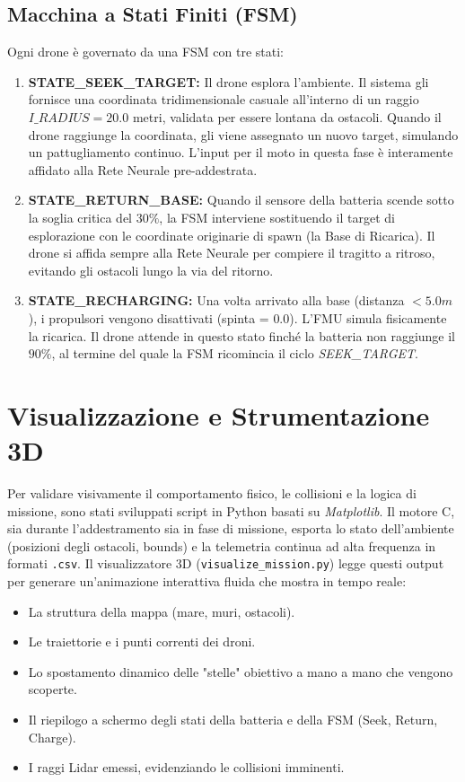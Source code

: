 ﻿\documentclass[12pt,a4paper]{article}
\begin{document}
\subsection{Macchina a Stati Finiti (FSM)}
Ogni drone è governato da una FSM con tre stati:
\begin{enumerate}
    \item \textbf{STATE\_SEEK\_TARGET:} Il drone esplora l'ambiente. Il sistema gli fornisce una coordinata tridimensionale casuale all'interno di un raggio $I\_RADIUS = 20.0$ metri, validata per essere lontana da ostacoli. Quando il drone raggiunge la coordinata, gli viene assegnato un nuovo target, simulando un pattugliamento continuo. L'input per il moto in questa fase è interamente affidato alla Rete Neurale pre-addestrata.
    \item \textbf{STATE\_RETURN\_BASE:} Quando il sensore della batteria scende sotto la soglia critica del $30\%$, la FSM interviene sostituendo il target di esplorazione con le coordinate originarie di spawn (la Base di Ricarica). Il drone si affida sempre alla Rete Neurale per compiere il tragitto a ritroso, evitando gli ostacoli lungo la via del ritorno.
    \item \textbf{STATE\_RECHARGING:} Una volta arrivato alla base (distanza $< 5.0m$), i propulsori vengono disattivati (spinta = $0.0$). L'FMU simula fisicamente la ricarica. Il drone attende in questo stato finché la batteria non raggiunge il $90\%$, al termine del quale la FSM ricomincia il ciclo \textit{SEEK\_TARGET}.
\end{enumerate}

\section{Visualizzazione e Strumentazione 3D}
Per validare visivamente il comportamento fisico, le collisioni e la logica di missione, sono stati sviluppati script in Python basati su \textit{Matplotlib}.
Il motore C, sia durante l'addestramento sia in fase di missione, esporta lo stato dell'ambiente (posizioni degli ostacoli, bounds) e la telemetria continua ad alta frequenza in formati \texttt{.csv}.
Il visualizzatore 3D (\texttt{visualize\_mission.py}) legge questi output per generare un'animazione interattiva fluida che mostra in tempo reale:
\begin{itemize}
    \item La struttura della mappa (mare, muri, ostacoli).
    \item Le traiettorie e i punti correnti dei droni.
    \item Lo spostamento dinamico delle "stelle" obiettivo a mano a mano che vengono scoperte.
    \item Il riepilogo a schermo degli stati della batteria e della FSM (Seek, Return, Charge).
    \item I raggi Lidar emessi, evidenziando le collisioni imminenti.
\end{itemize}
\end{document}
